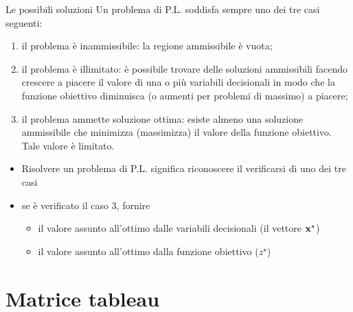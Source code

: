 \documentclass{beamer}
\begin{document}
\begin{frame}[allowframebreaks]{Le possibili soluzioni}
Un problema di P.L. soddisfa sempre uno dei tre casi seguenti:

\begin{enumerate}
\item il problema \`e inammissibile: la regione ammissibile \`e vuota;

\item il problema \`e illimitato: \`e possibile trovare delle soluzioni ammissibili facendo crescere a piacere il valore di una o pi\`u variabili decisionali in modo che la funzione obiettivo diminuisca (o aumenti per problemi di massimo) a piacere;

\item il problema ammette soluzione ottima: esiste almeno una soluzione ammissibile che minimizza (massimizza) il valore della funzione obiettivo. Tale valore \`e limitato.
\end{enumerate}	

\begin{itemize}
\item   Risolvere un problema di P.L. significa 
  riconoscere il verificarsi di uno dei tre casi

\item   se \`e verificato il caso 3, fornire
\begin{itemize}
  \item il valore assunto all'ottimo dalle variabili decisionali (il vettore $\mathbf{x}^\star$)
  \item il valore assunto all'ottimo dalla funzione obiettivo ($z^\star$)
\end{itemize}
\end{itemize}
\end{frame}

\section{Matrice tableau}
\end{document}
